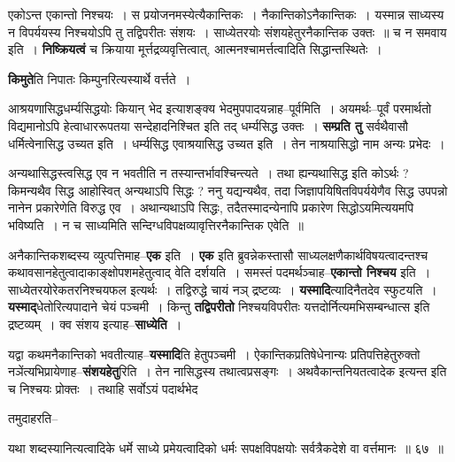\documentclass[article,12pt,a4paper]{memoir}
\begin{document}
	एकोऽन्त एकान्तो निश्चयः । स प्रयोजनमस्येत्यैकान्तिकः । नैकान्तिकोऽनैकान्तिकः । यस्मान्न साध्यस्य न विपर्ययस्य निश्चयोऽपि तु तद्विपरीतः संशयः । साध्येतरयोः संशयहेतुरनैकान्तिक उक्तः ॥ च न समवाय इति । \textbf{निष्क्रियत्वं} च क्रियाया मूर्त्तद्रव्यवृत्तित्वात्, आत्मनश्चामर्त्तत्वादिति सिद्धान्तस्थितेः ।
	\pend
      

	  \pstart \textbf{किमुते}ति निपातः किम्पुनरित्यस्यार्थे वर्त्तते ।
	\pend
      

	  \pstart आश्रयणासिद्धधर्म्यसिद्धयोः कियान् भेद इत्याशङ्क्य भेदमुपपादयन्नाह--पूर्वमिति । अयमर्थः--पूर्वं परमार्थतो विद्यमानोऽपि हेत्वाधाररूपतया सन्देहादनिश्चित इति तद् धर्म्यसिद्ध उक्तः । \textbf{सम्प्रति तु} सर्वथैवासौ धर्मित्वेनासिद्ध उच्यत इति । धर्म्यसिद्ध एवाश्रयासिद्ध उच्यत इति । तेन नाश्रयासिद्धो नाम अन्यः प्रभेदः ।
	\pend
      

	  \pstart अन्यथासिद्धस्त्वसिद्ध एव न भवतीति न तस्यान्तर्भावश्चिन्त्यते । तथा ह्यन्यथासिद्ध इति कोऽर्थः ? किमन्यथैव सिद्ध आहोस्वित् अन्यथाऽपि सिद्धः ? ननु यद्यन्यथैव, तदा जिज्ञापयिषितविपर्ययेणैव सिद्ध उपपन्नो नानेन प्रकारेणेति विरुद्ध एव । अथान्यथाऽपि सिद्धः, तदैतस्मादन्येनापि प्रकारेण सिद्धोऽयमित्ययमपि भविष्यति । न च साध्यमिति सन्दिग्धविपक्षव्यावृत्तिरनैकान्तिक एवेति ॥
	\pend
      

	  \pstart अनैकान्तिकशब्दस्य व्युत्पत्तिमाह--\textbf{एक} इति । \textbf{एक} इति ब्रुवन्नेकस्तासौ साध्यलक्षणैकार्थविषयत्वादन्तश्च कथावसानहेतुत्वादाकाङ्क्षोपशमहेतुत्वाद् वेति दर्शयति । समस्तं पदमर्थञ्चाह--\textbf{एकान्तो निश्चय} इति । साध्येतरयोरेकतरनिश्चयफल इत्यर्थः । तद्विरुद्धे चायं नञ् द्रष्टव्यः । \textbf{यस्मादि}त्यादिनैतदेव स्फुटयति । \textbf{यस्माद्}धेतोरित्यपादाने चेयं पञ्चमी । किन्तु \textbf{तद्विपरीतो} निश्चयविपरीतः यत्तदोर्नित्यमभिसम्बन्धात्स इति द्रष्टव्यम् । क्व संशय इत्याह--\textbf{साध्येति} ।
	\pend
      

	  \pstart यद्वा कथमनैकान्तिको भवतीत्याह--\textbf{यस्मादि}ति हेतुपञ्चमी । ऐकान्तिकप्रतिषेधेनान्यः प्रतिपत्तिहेतुरुक्तो नञेंत्यभिप्रायेणाह--\textbf{संशयहेतु}रिति । तेन नासिद्धस्य तथात्वप्रसङ्गः । अथवैकान्तनियतत्वादेक इत्यन्त इति च निश्चयः प्रोक्तः । तथाहि सर्वोऽयं पदार्थभेद  \leavevmode{} 
	  
	तमुदाहरति--  
	  
	यथा शब्दस्यानित्यत्वादिके धर्मे साध्ये प्रमेयत्वादिको धर्मः सपक्षविपक्षयोः सर्वत्रैकदेशे वा वर्त्तमानः ॥ ६७ ॥ 
	  
\end{document}
